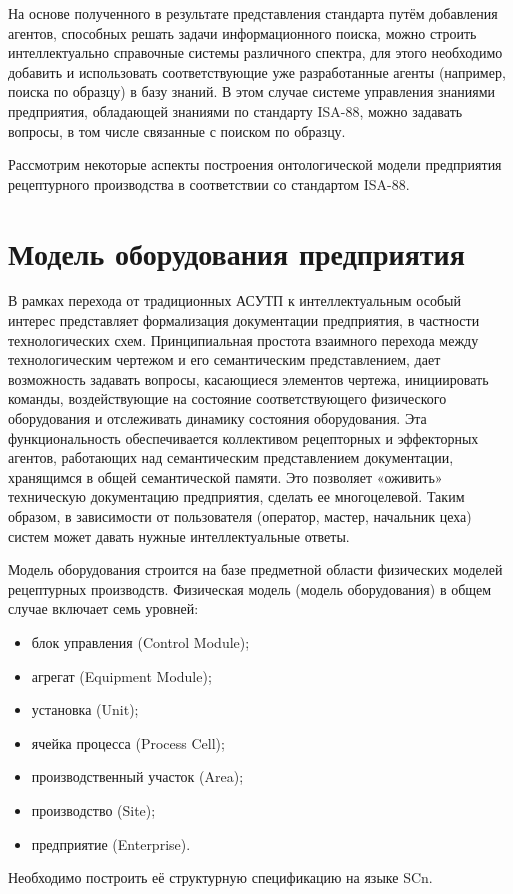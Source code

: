 На основе полученного в результате представления стандарта путём добавления агентов, способных решать задачи информационного поиска, можно строить интеллектуально справочные системы различного спектра, для этого необходимо добавить и использовать соответствующие уже разработанные агенты (например, поиска по образцу) в базу знаний. В этом случае системе управления знаниями предприятия, обладающей знаниями по стандарту ISA-88, можно задавать вопросы, в том числе связанные с поиском по образцу.

Рассмотрим некоторые аспекты построения онтологической модели предприятия рецептурного производства в соответствии со стандартом ISA-88.

\section{Модель оборудования предприятия}

В рамках перехода от традиционных АСУТП к интеллектуальным особый интерес представляет формализация документации предприятия, в частности технологических схем. Принципиальная простота взаимного перехода между технологическим чертежом и его семантическим представлением, дает возможность задавать вопросы, касающиеся элементов чертежа, инициировать команды, воздействующие на состояние соответствующего физического оборудования и отслеживать динамику состояния оборудования. Эта функциональность обеспечивается коллективом рецепторных и эффекторных агентов, работающих над семантическим представлением документации, хранящимся в общей семантической памяти. Это позволяет «оживить» техническую документацию предприятия, сделать ее многоцелевой. Таким образом, в зависимости от пользователя (оператор, мастер, начальник цеха) систем может давать нужные интеллектуальные ответы.

Модель оборудования строится на базе предметной области физических моделей рецептурных производств. Физическая модель (модель оборудования) в общем случае включает семь уровней:

\begin{itemize}
    \item блок управления (Control Module);
    \item агрегат (Equipment Module);
    \item установка (Unit);
    \item ячейка процесса (Process Cell);
    \item производственный участок (Area);
    \item производство (Site);
    \item предприятие (Enterprise).
\end{itemize}

Необходимо построить её структурную спецификацию на языке SCn.
